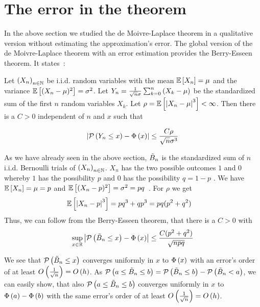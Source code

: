 \section{The error in the theorem}

In the above section we studied the de Moivre-Laplace theorem in a qualitative version without estimating the approximation's error. The global version of the de Moivre-Laplace theorem with an error estimation provides the Berry-Esseen theorem. It states~\cite[70-71]{nourdin}\cite{wiki:berry}:

\begin{theorem}
  Let $\left({X_n}\right)_{{n}\in\mathbb N}$ be i.i.d. random variables with the mean $\mathbb E\left[{X_n}\right]=\mu$ and the variance $\mathbb E\left[{(X_n-\mu)^2}\right]=\sigma^2$. Let $Y_n = \frac 1{\sqrt{n}\sigma} \sum_{k=0}^n \left( {X_k-\mu} \right)$ be the standardized sum of the first $n$ random variables $X_k$. Let $\rho = \mathbb E\left[{\left|{X_n-\mu}\right|^3}\right] < \infty$. Then there is a $C>0$ independent of $n$ and $x$ such that

  \begin{align}
    \left|{\mathcal P\left({Y_n \le x}\right) - \Phi\left( {x} \right)}\right| \le \frac{C \rho}{\sqrt n \sigma^3}
  \end{align}
\end{theorem}

As we have already seen in the above section, $\tilde B_{n}$ is the standardized sum of $n$ i.i.d. Bernoulli trials of $\left({X_n}\right)_{{n}\in\mathbb N}$. $X_n$ has the two possible outcomes $1$ and $0$ whereby $1$ has the possibility $p$ and $0$ has the possibility $q=1-p$ \cite[p. 32]{georgii}\cite{wiki:bernoulli_distribution}. We have $\mathbb E\left[{X_n}\right] = \mu = p$ and $\mathbb E\left[{(X_n-p)^2}\right]=\sigma^2=pq$~\cite{wiki:bernoulli_distribution}\cite[p. 112]{georgii}. For $\rho$ we get
\begin{align}
  \mathbb E\left[{\left|{X_n-p}\right|^3}\right] &= p q^3 + q p^3 = pq (p^2+q^2)
\end{align}
Thus, we can follow from the Berry-Esseen theorem, that there is a $C>0$ with
\begin{align}
  \sup_{x\in\mathbb R} \left|{\mathcal P\left({\tilde B_{n} \le x}\right)-\Phi\left( {x} \right)}\right| \le \frac{C(p^2+q^2)}{\sqrt{npq}}
\end{align}

We see that $\mathcal P\left({\tilde B_{n} \le x}\right)$ converges uniformly in $x$ to $\Phi\left( {x} \right)$ with an error's order of at least $O\left( {\frac 1{\sqrt{n}}} \right)=O\left( {h} \right)$. As $\mathcal P\left({a\le \tilde B_{n} \le b}\right) = \mathcal P\left({\tilde B_{n} \le b}\right) - \mathcal P\left({\tilde B_{n} < a}\right)$, we can easily show, that also $\mathcal P\left({a \le \tilde B_{n} \le b}\right)$ converges uniformly in $x$ to $\Phi\left( {a} \right)-\Phi\left( {b} \right)$ with the same error's order of at least $O\left( {\frac 1{\sqrt{n}}} \right)=O\left( {h} \right)$.

